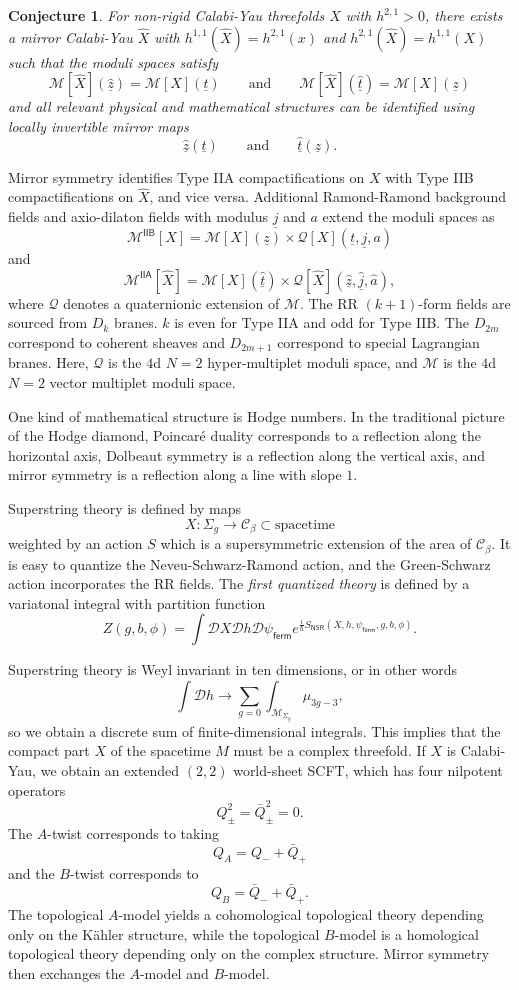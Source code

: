 \documentclass[10pt]{amsart}
\newtheorem{conj}[thm]{Conjecture}
\theoremstyle{definition}
\theoremstyle{remark}
\theoremstyle{plain}
\theoremstyle{definition}
\theoremstyle{remark}
\newcommand{\mc}[1]{\mathcal{#1}}
\newcommand{\ut}{\ul{t}}
\newcommand{\uz}{\ul{z}}
\newcommand{\ur}{\ul{j}}
\newcommand{\ms}[1]{\mathsf{#1}}
\newcommand{\ul}[1]{\underline{#1}}
\newcommand{\1}{\mathbf{1}}
\newcommand{\2}{\mathbf{2}}
\newcommand{\3}{\mathbf{3}}
\newcommand{\IIA}{\ms{IIA}}
\newcommand{\IIB}{\ms{IIB}}
\begin{document}
\begin{conj}
    For non-rigid Calabi-Yau threefolds $X$ with $h^{2,1} > 0$, there exists a mirror Calabi-Yau $\hat{X}$ with $h^{1,1}(\hat{X})= h^{2,1}(x)$ and $h^{2,1}(\hat{X}) = h^{1,1}(X)$ such that the moduli spaces satisfy
    \[ \mc{M}[\hat{X}](\hat{\uz}) = \mc{M}[X](\ut) \qquad \text{and} \qquad \mc{M}[\hat{X}](\hat{\ut}) = \mc{M}[X](\uz) \]
    and all relevant physical and mathematical structures can be identified using locally invertible mirror maps
    \[ \hat{\uz}(\ut) \qquad \text{and} \qquad \hat{\ut}(\uz). \]
\end{conj}

Mirror symmetry identifies Type IIA compactifications on $X$ with Type IIB compactifications on $\hat{X}$, and vice versa. Additional Ramond-Ramond background fields and axio-dilaton fields with modulus $\ur$ and $a$ extend the moduli spaces as
\[ \mc{M}^{\IIB}[X] = \mc{M}[X](\uz) \times \mc{Q}[X](\ut, \ur, a) \]
and 
\[ \mc{M}^{\IIA}[\hat{X}] = \mc{M}[X](\hat{\ut}) \times \mc{Q}[\hat{X}](\hat{\uz}, \hat{\ur}, \hat{a}), \]
where $\mc{Q}$ denotes a quaternionic extension of $\mc{M}$. The RR $(k+1)$-form fields are sourced from $D_k$ branes. $k$ is even for Type IIA and odd for Type IIB. The $D_{2m}$ correspond to coherent sheaves and $D_{2m+1}$ correspond to special Lagrangian branes. Here, $\mc{Q}$ is the $4$d $N=2$ hyper-multiplet moduli space, and $\mc{M}$ is the $4$d $N=2$ vector multiplet moduli space.

One kind of mathematical structure is Hodge numbers. In the traditional picture of the Hodge diamond, Poincar\'e duality corresponds to a reflection along the horizontal axis, Dolbeaut symmetry is a reflection along the vertical axis, and mirror symmetry is a reflection along a line with slope $1$.

Superstring theory is defined by maps
\[ X \colon \Sigma_g \to \mc{C}_{\beta} \subset \text{spacetime} \]
weighted by an action $S$ which is a supersymmetric extension of the area of $\mc{C}_{\beta}$. It is easy to quantize the Neveu-Schwarz-Ramond action, and the Green-Schwarz action incorporates the RR fields. The \textit{first quantized theory} is defined by a variatonal integral with partition function
\[ Z(g,b,\phi) = \int \mc{D}X \mc{D}h \mc{D}\psi_{\ms{ferm}} e^{\frac{i}{\hbar} S_{\ms{NSR}}(X,h,\psi_{\ms{ferm}},g,b,\phi)}. \]

Superstring theory is Weyl invariant in ten dimensions, or in other words
\[ \int \mc{D}h \to \sum_{g = 0} \int_{\mc{M}_{\Sigma_g}} \mu_{3g-3}, \]
so we obtain a discrete sum of finite-dimensional integrals. This implies that the compact part $X$ of the spacetime $M$ must be a complex threefold. If $X$ is Calabi-Yau, we obtain an extended $(2,2)$ world-sheet SCFT, which has four nilpotent operators
\[ Q_{\pm}^2 = \bar{Q}_{\pm}^2 = 0. \]
The $A$-twist corresponds to taking
\[ Q_A = Q_- + \bar{Q}_+ \]
and the $B$-twist corresponds to
\[ Q_B = \bar{Q}_- + \bar{Q}_+. \]
The topological $A$-model yields a cohomological topological theory depending only on the K\"ahler structure, while the topological $B$-model is a homological topological theory depending only on the complex structure. Mirror symmetry then exchanges the $A$-model and $B$-model.
\end{document}
